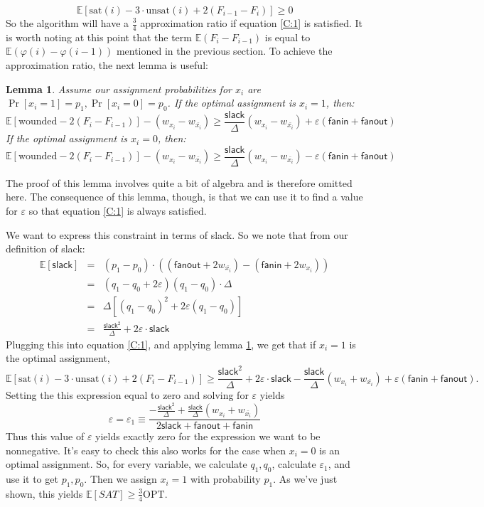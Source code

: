 \documentclass[11pt,letter]{article}
\newtheorem{lemma}[theorem]{Lemma}
\numberwithin{theorem}{section}
\renewcommand{\phi}{\varphi}
\renewcommand{\epsilon}{\varepsilon}
\begin{document}
\begin{equation}
\mathbb{E}[\textrm{sat}(i) - 3\cdot\textrm{unsat}(i)+ 2(F_{i-1}-F_i)] \ge 0 \label{C:1}
\end{equation}
So the algorithm will have a $\frac{3}{4}$ approximation ratio if equation \ref{C:1} is satisfied. It is worth noting at this 
point that the term $\mathbb{E}(F_{i}-F_{i-1})$ is equal to
$\mathbb{E}(\phi(i) - \phi(i-1))$ mentioned in the previous section. To achieve the approximation ratio, the next lemma is useful:
\begin{lemma} \label{L:3}
Assume our assignment probabilities for $x_i$ are $\Pr[x_i = 1] = p_1, \Pr[x_i =0] = p_0$. If the optimal assignment is $x_i =1$, then:
\[\mathbb{E}[\textrm{wounded} - 2(F_{i}-F_{i-1})] - (w_{x_i} - w_{\bar{x_i}}) \ge \frac{\mathsf{slack}}{\Delta}(w_{x_i} - w_{\bar{x_i}}) + \varepsilon(\mathsf{fanin} + \mathsf{fanout})\]
If the optimal assignment is  $x_i=0$, then:
\[\mathbb{E}[\textrm{wounded} - 2(F_{i}-F_{i-1})] - (w_{x_i} - w_{\bar{x_i}}) \ge \frac{\mathsf{slack}}{\Delta}(w_{x_i} - w_{\bar{x_i}}) - \varepsilon(\mathsf{fanin} + \mathsf{fanout})\]
\end{lemma}
The proof of this lemma involves quite a bit of algebra and is therefore omitted here. The consequence of this lemma, though, is that we can use it to find a value for $\varepsilon$ so that equation \ref{C:1} is always satisfied.

We want to express this constraint in terms of slack. So we note that from our definition of slack:
\begin{eqnarray*}
\mathbb{E}[\mathsf{slack}] &=& (p_1-p_0)\cdot ((\mathsf{fanout} + 2w_{\bar{x_i}}) -(\mathsf{fanin} + 2w_{x_i}))
\\&=& (q_1-q_0+2\epsilon)(q_1-q_0)\cdot\Delta
\\&=& \Delta[(q_1-q_0)^2 + 2\varepsilon(q_1-q_0)]
\\&=& \frac{\mathsf{slack}^2}{\Delta} +2\varepsilon\cdot\mathsf{slack}
\end{eqnarray*}
Plugging this into equation \ref{C:1}, and applying lemma \ref{L:3}, we get that if $x_i =1$ is the optimal assignment,
\[\mathbb{E}[\textrm{sat}(i) - 3\cdot\textrm{unsat}(i)+ 2(F_{i}-F_{i-1})] \ge \frac{\mathsf{slack}^2}{\Delta} +2\varepsilon\cdot\mathsf{slack} - \frac{\mathsf{slack}}{\Delta}(w_{x_i} + w_{\bar{x_i}}) + \varepsilon(\mathsf{fanin} + \mathsf{fanout}).\]
Setting the this expression equal to zero and solving for $\varepsilon$ yields
\begin{equation}
\varepsilon = \varepsilon_1 \equiv \frac{-\frac{\mathsf{slack}^2}{\Delta} + \frac{\mathsf{slack}}{\Delta}(w_{x_i} + w_{\bar{x_i}})}{2\mathsf{slack}+ \mathsf{fanout} + \mathsf{fanin}}
\end{equation}
Thus this value of $\varepsilon$ yields exactly zero for the expression we want to be nonnegative. It's easy to check this also works for the case when $x_i=0$ is an optimal assignment. So, for every variable, we calculate $q_1, q_0$, calculate $\varepsilon_1$, and use it to get $p_1, p_0$. Then we assign $x_i=1$ with probability $p_1$. As we've just shown, this yields $\mathbb{E}[SAT] \ge \frac{3}{4}\textrm{OPT}$.
\end{document}
